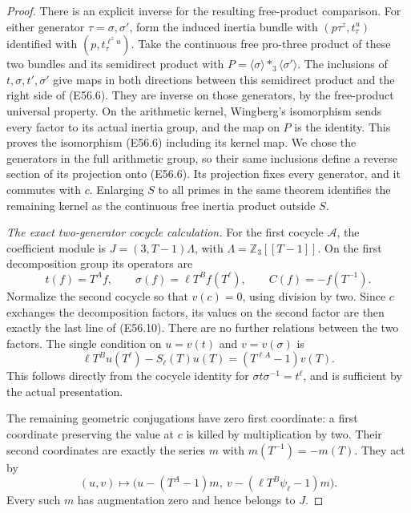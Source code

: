 \begin{proof}
There is an explicit inverse for the resulting
free-product comparison. For either generator
$\tau=\sigma,\sigma'$, form the induced
inertia bundle with
$(p\tau^z,t_\tau^u)$ identified with
$(p,t_\tau^{\ell^zu})$.
Take the continuous free pro-three product of
these two bundles and its semidirect product
with $P=\langle\sigma\rangle\ast_3\langle\sigma'\rangle$.
The inclusions of $t,\sigma,t',\sigma'$ give maps
in both directions between this semidirect
product and the right side of (E56.6).
They are inverse on those generators, by the
free-product universal property.
On the arithmetic kernel, Wingberg's
isomorphism sends every factor to its actual
inertia group, and the map on $P$ is the
identity. This proves the isomorphism
(E56.6) including its kernel map.
We chose the generators in the full
arithmetic group, so their same inclusions
define a reverse section of its projection
onto (E56.6). Its projection fixes every
generator, and it commutes with $c$.
Enlarging $S$ to all primes in the same
theorem identifies the remaining kernel
as the continuous free inertia product
outside $S$.

\emph{The exact two-generator cocycle calculation.}
For the first cocycle $\mathcal A$, the coefficient
module is $J=(3,T-1)\Lambda$, with
$\Lambda=\mathbb Z_3[[T-1]]$.
On the first decomposition group its operators are
\[
    t(f)=T^Af,\qquad
    \sigma(f)=\ell T^B f(T^\ell),\qquad
    C(f)=-f(T^{-1}).
 \tag{E56.14}
\]
Normalize the second cocycle so that $v(c)=0$,
using division by two. Since $c$ exchanges
the decomposition factors, its values on the
second factor are then exactly the last line
of (E56.10). There are no further relations
between the two factors. The single condition
on $u=v(t)$ and $v=v(\sigma)$ is
\[
       \ell T^Bu(T^\ell)-S_\ell(T)u(T)
                                      =(T^{\ell A}-1)v(T).
 \tag{E56.15}
\]
This follows directly from the cocycle identity
for $\sigma t\sigma^{-1}=t^\ell$, and is
sufficient by the actual presentation.

The remaining geometric conjugations have
zero first coordinate: a first coordinate
preserving the value at $c$ is killed by
multiplication by two. Their second
coordinates are exactly the series
$m$ with $m(T^{-1})=-m(T)$.
They act by
\[
       (u,v)\longmapsto
       \bigl(u-(T^A-1)m,\ 
             v-(\ell T^B\psi_\ell-1)m\bigr).
 \tag{E56.16}
\]
Every such $m$ has augmentation zero
and hence belongs to $J$.


\end{proof}
